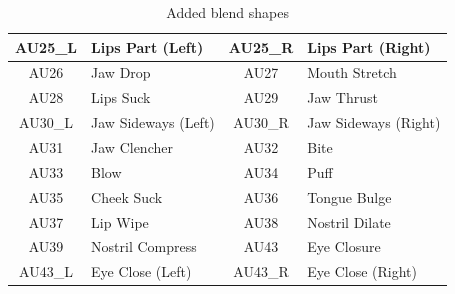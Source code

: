 \documentclass[../../main.tex]{subfiles}
\begin{document}
\begin{table}[h]
\begin{tabular}{|c|l|c|l|}
        AU25\_L          & Lips Part (Left)                        & AU25\_R           & Lips Part (Right)                         \\ \hline
        AU26             & Jaw Drop                                & AU27             & Mouth Stretch                             \\ \hline
        AU28             & Lips Suck                               & AU29             & Jaw Thrust                                \\ \hline
        AU30\_L          & Jaw Sideways (Left)                     & AU30\_R           & Jaw Sideways (Right)                      \\ \hline
        AU31             & Jaw Clencher                            & AU32             & Bite                                      \\ \hline
        AU33             & Blow                                    & AU34             & Puff                                      \\ \hline
        AU35             & Cheek Suck                              & AU36             & Tongue Bulge                              \\ \hline
        AU37             & Lip Wipe                                & AU38             & Nostril Dilate                            \\ \hline
        AU39             & Nostril Compress                        & AU43             & Eye Closure                               \\ \hline
        AU43\_L          & Eye Close (Left)                        & AU43\_R           & Eye Close (Right)                         \\ \hline
    \end{tabular}
    \caption{Added blend shapes} 
    \label{tab:added_units} 
\end{table}
\end{document}
